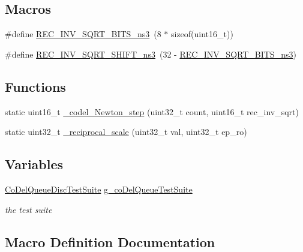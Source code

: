 \subsection*{Macros}
\begin{DoxyCompactItemize}
\item 
\#define \hyperlink{codel-queue-disc-test-suite_8cc_a16fb852a9116978c8ab75115deda8026}{R\+E\+C\+\_\+\+I\+N\+V\+\_\+\+S\+Q\+R\+T\+\_\+\+B\+I\+T\+S\+\_\+ns3}~(8 $\ast$ sizeof(uint16\+\_\+t))
\item 
\#define \hyperlink{codel-queue-disc-test-suite_8cc_a1760008e31152c2cec84f74585b5a509}{R\+E\+C\+\_\+\+I\+N\+V\+\_\+\+S\+Q\+R\+T\+\_\+\+S\+H\+I\+F\+T\+\_\+ns3}~(32 -\/ \hyperlink{codel-queue-disc-test-suite_8cc_a16fb852a9116978c8ab75115deda8026}{R\+E\+C\+\_\+\+I\+N\+V\+\_\+\+S\+Q\+R\+T\+\_\+\+B\+I\+T\+S\+\_\+ns3})
\end{DoxyCompactItemize}
\subsection*{Functions}
\begin{DoxyCompactItemize}
\item 
static uint16\+\_\+t \hyperlink{codel-queue-disc-test-suite_8cc_a3ba0818891ce32832dc51eceff6b9f41}{\+\_\+codel\+\_\+\+Newton\+\_\+step} (uint32\+\_\+t count, uint16\+\_\+t rec\+\_\+inv\+\_\+sqrt)
\item 
static uint32\+\_\+t \hyperlink{codel-queue-disc-test-suite_8cc_ab016a47fbb0ada145810883fd09bd138}{\+\_\+reciprocal\+\_\+scale} (uint32\+\_\+t val, uint32\+\_\+t ep\+\_\+ro)
\end{DoxyCompactItemize}
\subsection*{Variables}
\begin{DoxyCompactItemize}
\item 
\hyperlink{classCoDelQueueDiscTestSuite}{Co\+Del\+Queue\+Disc\+Test\+Suite} \hyperlink{group__traffic-control-test_gafcd415bd70772eea582f283383c885ba}{g\+\_\+co\+Del\+Queue\+Test\+Suite}
\begin{DoxyCompactList}\small\item\em the test suite \end{DoxyCompactList}\end{DoxyCompactItemize}


\subsection{Macro Definition Documentation}

